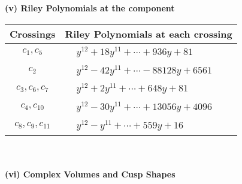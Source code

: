 \documentclass[1p]{elsarticle_modified}
\theoremstyle{definition}
\begin{document}
\newpage\renewcommand{\arraystretch}{1}
\flushleft \textbf{(v) Riley Polynomials at the component}\newline \\
\begin{tabular}{m{50pt}|m{274pt}}
Crossings & \hspace{64pt}Riley Polynomials at each crossing \\
\hline $$\begin{aligned}c_{1},c_{5}\end{aligned}$$&$\begin{aligned}
&y^{12}+18 y^{11}+\cdots+936 y+81
\end{aligned}$\\
\hline $$\begin{aligned}c_{2}\end{aligned}$$&$\begin{aligned}
&y^{12}-42 y^{11}+\cdots-88128 y+6561
\end{aligned}$\\
\hline $$\begin{aligned}c_{3},c_{6},c_{7}\end{aligned}$$&$\begin{aligned}
&y^{12}+2 y^{11}+\cdots+648 y+81
\end{aligned}$\\
\hline $$\begin{aligned}c_{4},c_{10}\end{aligned}$$&$\begin{aligned}
&y^{12}-30 y^{11}+\cdots+13056 y+4096
\end{aligned}$\\
\hline $$\begin{aligned}c_{8},c_{9},c_{11}\end{aligned}$$&$\begin{aligned}
&y^{12}- y^{11}+\cdots+559 y+16
\end{aligned}$\\
\hline
\end{tabular}\\~\\
\newpage\flushleft \textbf{(vi) Complex Volumes and Cusp Shapes}
\end{document}
